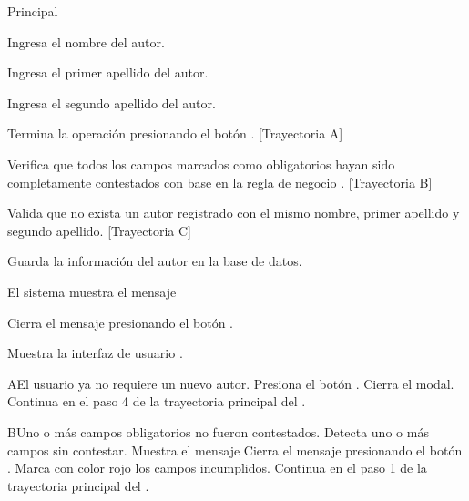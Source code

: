 \begin{UCtrayectoria}{Principal}

    \UCpaso[\UCactor] Ingresa el nombre del autor.

    \UCpaso[\UCactor] Ingresa el primer apellido del autor.

    \UCpaso[\UCactor] Ingresa el segundo apellido del autor.

    \UCpaso[\UCactor] Termina la operación presionando el botón . [Trayectoria A]

    \UCpaso Verifica que todos los campos marcados como obligatorios hayan sido completamente contestados con base en la regla de negocio . [Trayectoria B]

    \UCpaso Valida que no exista un autor registrado con el mismo nombre, primer apellido y segundo apellido. [Trayectoria C]

    \UCpaso Guarda la información del autor en la base de datos.

    \UCpaso El sistema muestra el mensaje 

    \UCpaso[\UCactor] Cierra el mensaje presionando el botón .

    \UCpaso Muestra la interfaz de usuario .
\end{UCtrayectoria}


\begin{UCtrayectoriaA}{A}{El usuario ya no requiere un nuevo autor.}
    \UCpaso[\UCactor] Presiona el botón .
    \UCpaso Cierra el modal.
    \UCpaso Continua en el paso 4 de la trayectoria principal del .
\end{UCtrayectoriaA}


\begin{UCtrayectoriaA}{B}{Uno o más campos obligatorios no fueron contestados.}
    \UCpaso Detecta uno o más campos sin contestar.
    \UCpaso Muestra el mensaje 
    \UCpaso[\UCactor] Cierra el mensaje presionando el botón .
    \UCpaso Marca con color rojo los campos incumplidos.
    \UCpaso Continua en el paso 1 de la trayectoria principal del .
\end{UCtrayectoriaA}

